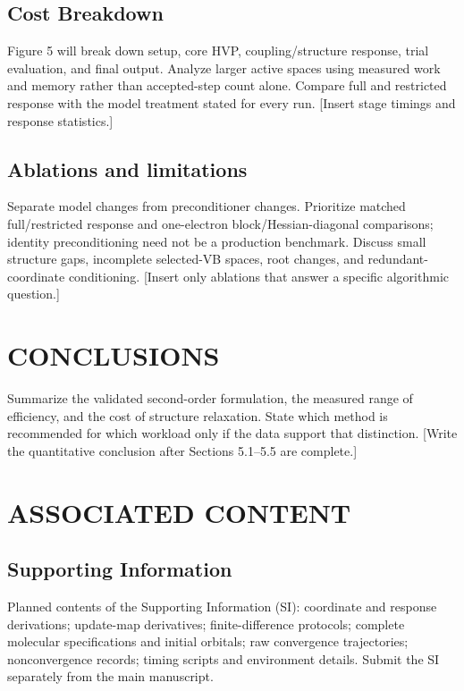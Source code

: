 \documentclass[12pt]{article}
\begin{document}
\subsection{Cost Breakdown}

Figure 5 will break down setup, core HVP, coupling/structure response, trial evaluation, and final output. Analyze larger active spaces using measured work and memory rather than accepted-step count alone. Compare full and restricted response with the model treatment stated for every run. [Insert stage timings and response statistics.]


\subsection{Ablations and limitations}

Separate model changes from preconditioner changes. Prioritize matched full/restricted response and one-electron block/Hessian-diagonal comparisons; identity preconditioning need not be a production benchmark. Discuss small structure gaps, incomplete selected-VB spaces, root changes, and redundant-coordinate conditioning. [Insert only ablations that answer a specific algorithmic question.]


\section{CONCLUSIONS}

Summarize the validated second-order formulation, the measured range of efficiency, and the cost of structure relaxation. State which method is recommended for which workload only if the data support that distinction. [Write the quantitative conclusion after Sections 5.1--5.5 are complete.]


\section*{ASSOCIATED CONTENT}

\subsection*{Supporting Information}

Planned contents of the Supporting Information (SI): coordinate and response derivations; update-map derivatives; finite-difference protocols; complete molecular specifications and initial orbitals; raw convergence trajectories; nonconvergence records; timing scripts and environment details. Submit the SI separately from the main manuscript.
\end{document}

